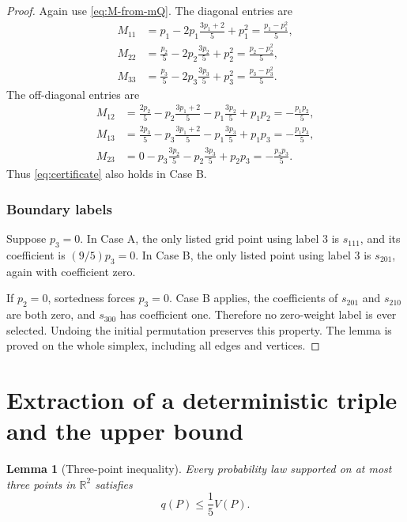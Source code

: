 \documentclass[11pt]{article}
\newtheorem{lemma}[theorem]{Lemma}
\theoremstyle{definition}
\theoremstyle{remark}
\newcommand{\R}{\mathbb{R}}
\begin{document}
\begin{proof}
Again use \eqref{eq:M-from-mQ}.  The diagonal entries are
\begin{align*}
M_{11}
&=p_1-2p_1\frac{3p_1+2}{5}+p_1^2
=\frac{p_1-p_1^2}{5},\\
M_{22}
&=\frac{p_2}{5}-2p_2\frac{3p_2}{5}+p_2^2
=\frac{p_2-p_2^2}{5},\\
M_{33}
&=\frac{p_3}{5}-2p_3\frac{3p_3}{5}+p_3^2
=\frac{p_3-p_3^2}{5}.
\end{align*}
The off-diagonal entries are
\begin{align*}
M_{12}
&=\frac{2p_2}{5}
 -p_2\frac{3p_1+2}{5}
 -p_1\frac{3p_2}{5}+p_1p_2
=-\frac{p_1p_2}{5},\\
M_{13}
&=\frac{2p_3}{5}
 -p_3\frac{3p_1+2}{5}
 -p_1\frac{3p_3}{5}+p_1p_3
=-\frac{p_1p_3}{5},\\
M_{23}
&=0-p_3\frac{3p_2}{5}-p_2\frac{3p_3}{5}+p_2p_3
=-\frac{p_2p_3}{5}.
\end{align*}
Thus \eqref{eq:certificate} also holds in Case B.

\subsubsection*{Boundary labels}
Suppose $p_3=0$.  In Case A, the only listed grid point using label $3$ is $s_{111}$, and its coefficient is $(9/5)p_3=0$.  In Case B, the only listed point using label $3$ is $s_{201}$, again with coefficient zero.

If $p_2=0$, sortedness forces $p_3=0$.  Case B applies, the coefficients of $s_{201}$ and $s_{210}$ are both zero, and $s_{300}$ has coefficient one.  Therefore no zero-weight label is ever selected.  Undoing the initial permutation preserves this property.  The lemma is proved on the whole simplex, including all edges and vertices.
\end{proof}

\section{Extraction of a deterministic triple and the upper bound}

\begin{lemma}[Three-point inequality]
Every probability law supported on at most three points in $\R^2$ satisfies
\begin{equation}
q(P)\le\frac15V(P).
\label{eq:three-point-ineq}
\end{equation}
\end{lemma}
\end{document}
